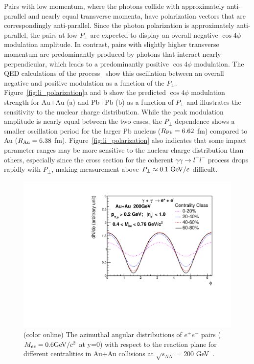 \documentclass[12pt,epjc3]{svjour3}\sloppy
\begin{document}
Pairs with low momentum, where the photons collide with approximately anti-parallel and nearly equal transverse momenta, have polarization vectors that are correspondingly anti-parallel. Since the photon polarization is approximately anti-parallel, the pairs at low $P_\perp$ are expected to display an overall negative $\cos4\phi$ modulation amplitude.
In contrast, pairs with slightly higher transverse momentum are predominantly produced by photons that interact nearly perpendicular, which leads to a predominantly positive $\cos4\phi$ modulation. The QED calculations of the process~\cite{liImpactParameterDependence2020} show this oscillation between an overall negative and positive modulation as a function of the $P_\perp$. Figure~\ref{fig:li_polarization}a and b show the predicted $\cos4\phi$ modulation strength for Au$+$Au (a) and Pb$+$Pb (b) as a function of $P_\perp$ and illustrates the sensitivity to the nuclear charge distribution. 
While the peak modulation amplitude is nearly equal between the two cases, the $P_\perp$ dependence shows a smaller oscillation period for the larger Pb nucleus ($R_{\rm Pb} = 6.62$ fm) compared to Au ($R_{\rm Au} = 6.38$ fm). 
Figure~\ref{fig:li_polarization} also indicates that some impact parameter ranges may be more sensitive to the nuclear charge distribution than others, especially since the cross section for the coherent $\gamma\gamma \rightarrow l^+l^-$ process drops rapidly with $P_\perp$, making measurement above $P_\perp\approx 0.1 {\rm\ GeV}/c$ difficult.


\begin{figure}
    \centering
    \includegraphics[width=.99\linewidth]{fig/drawphidis_b.pdf}
    \caption{(color online) 
    The azimuthal angular distributions of $e^+e^-$ pairs ($M_{ee}=0.6 {\rm GeV}/c^2$ at y=0) with respect to the reaction plane for different centralities in Au+Au collisions at $\sqrt{s_{NN}} = 200 $ GeV~\cite{zhaInitialTransversemomentumBroadening2020b}. 
  }
  \label{fig:future}
\end{figure}
\end{document}
